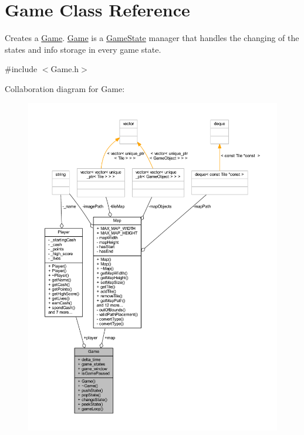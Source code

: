 \hypertarget{class_game}{\section{Game Class Reference}
\label{class_game}
}


Creates a \hyperlink{class_game}{Game}. \hyperlink{class_game}{Game} is a \hyperlink{class_game_state}{Game\+State} manager that handles the changing of the states and info storage in every game state.  




{\ttfamily \#include $<$Game.\+h$>$}



Collaboration diagram for Game\+:\nopagebreak
\begin{figure}[H]
\begin{center}
\leavevmode
\includegraphics[width=350pt]{class_game__coll__graph}
\end{center}
\end{figure}
